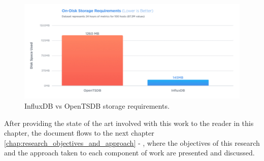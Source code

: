 \begin{figure}[H]
    \centering
    \includegraphics[width=1.00\textwidth]{images/influxdb_vs_opentsdb_storage_requirements.pdf}
    \caption{InfluxDB vs OpenTSDB storage requirements\cite{influxdb_vs_opentsdb}.}
    \label{fig:influxdb_vs_opentsdb_storage_requirements}
\end{figure}

After providing the state of the art involved with this work to the reader in this chapter, the document flows to the next chapter \ref{chap:research_objectives_and_approach} - , where the objectives of this research and the approach taken to each component of work are presented and discussed.

\checkoddpage
{}
{ %
\newpage
\blankpage}
{ %
}
